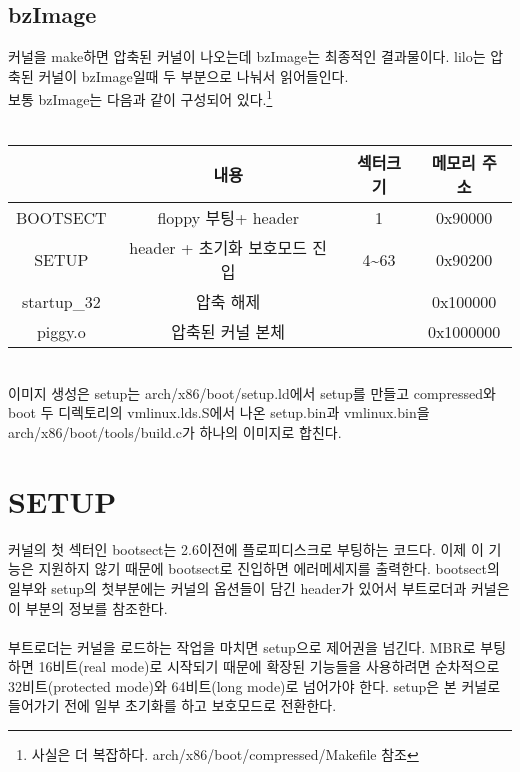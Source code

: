 \documentclass[a4paper,11pt]{report}
\begin{document}
\begin{CJK}{UTF8}{}
\section{bzImage}
커널을 make하면 압축된 커널이 나오는데 bzImage는 최종적인 결과물이다.
lilo는 압축된 커널이 bzImage일때 두 부분으로 나눠서 읽어들인다.\\
보통 bzImage는 다음과 같이 구성되어 있다.\footnote{사실은 더 복잡하다. arch/x86/boot/compressed/Makefile 참조}\\\\
\begin{tabular}{|c|c|c|c|}
\hline
& 내용 & 섹터크기 & 메모리 주소\\ \hline
BOOTSECT & floppy 부팅\footnotemark[7] + header & 1 & 0x90000 \\ \hline
SETUP & header + 초기화 보호모드 진입 & 4\sim63 & 0x90200 \\ \hline %
startup\_32 & 압축 해제 & & 0x100000 \\ \hline
piggy.o & 압축된 커널 본체 & & 0x1000000\footnotemark[8] \\ \hline
\end{tabular}

\\
이미지 생성은 setup는 arch/x86/boot/setup.ld에서 setup를 만들고 compressed와 boot 두 디렉토리의 vmlinux.lds.S에서 나온 setup.bin과 vmlinux.bin을 arch/x86/boot/tools/build.c가 하나의 이미지로 합친다.

\chapter{SETUP}
커널의 첫 섹터인 bootsect는 2.6이전에 플로피디스크로 부팅하는 코드다. 이제 이 기능은 지원하지 않기 때문에 bootsect로 진입하면 에러메세지를 출력한다. 
bootsect의 일부와 setup의 첫부분에는 커널의 옵션들이 담긴 header가 있어서 부트로더과 커널은 이 부분의 정보를 참조한다.\\\\
 부트로더는 커널을 로드하는 작업을 마치면 setup으로 제어권을 넘긴다. MBR로 부팅하면 16비트(real mode)로 시작되기 때문에 확장된 기능들을 사용하려면 순차적으로 32비트(protected mode)와 64비트(long mode)로 넘어가야 한다. setup은 본 커널로 들어가기 전에 일부 초기화를 하고 보호모드로 전환한다.


\end{CJK}
\end{document}
